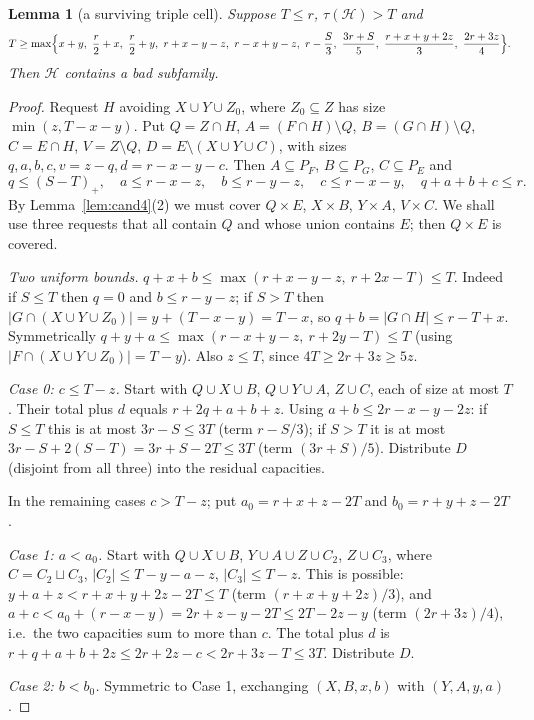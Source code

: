 \documentclass[11pt]{amsart}
\newtheorem{lemma}[theorem]{Lemma}
\theoremstyle{definition}
\theoremstyle{remark}
\newcommand{\cH}{\mathcal H}
\begin{document}
\begin{lemma}[a surviving triple cell]\label{lem:L31}
Suppose $T\le r$, $\tau(\cH)>T$ and
\[
T\ge\max\Bigl\{x+y,\ \frac r2+x,\ \frac r2+y,\ r+x-y-z,\ r-x+y-z,\ r-\frac S3,\ \frac{3r+S}{5},\ \frac{r+x+y+2z}{3},\ \frac{2r+3z}{4}\Bigr\}.
\]
Then $\cH$ contains a bad subfamily.
\end{lemma}
\begin{proof}
Request $H$ avoiding $X\cup Y\cup Z_0$, where $Z_0\subseteq Z$ has size $\min(z,T-x-y)$. Put $Q=Z\cap H$, $A=(F\cap H)\setminus Q$, $B=(G\cap H)\setminus Q$, $C=E\cap H$, $V=Z\setminus Q$, $D=E\setminus(X\cup Y\cup C)$, with sizes $q,a,b,c,v=z-q,d=r-x-y-c$. Then $A\subseteq P_F$, $B\subseteq P_G$, $C\subseteq P_E$ and
\[
q\le(S-T)_+,\quad a\le r-x-z,\quad b\le r-y-z,\quad c\le r-x-y,\quad q+a+b+c\le r .
\]
By Lemma~\ref{lem:cand4}(2) we must cover $Q\times E$, $X\times B$, $Y\times A$, $V\times C$. We shall use three requests that all contain $Q$ and whose union contains $E$; then $Q\times E$ is covered.

\emph{Two uniform bounds.} $q+x+b\le\max(r+x-y-z,\ r+2x-T)\le T$. Indeed if $S\le T$ then $q=0$ and $b\le r-y-z$; if $S>T$ then $|G\cap(X\cup Y\cup Z_0)|=y+(T-x-y)=T-x$, so $q+b=|G\cap H|\le r-T+x$. Symmetrically $q+y+a\le\max(r-x+y-z,\ r+2y-T)\le T$ (using $|F\cap(X\cup Y\cup Z_0)|=T-y$). Also $z\le T$, since $4T\ge2r+3z\ge5z$.

\emph{Case 0: $c\le T-z$.} Start with $Q\cup X\cup B$, $Q\cup Y\cup A$, $Z\cup C$, each of size at most $T$. Their total plus $d$ equals $r+2q+a+b+z$. Using $a+b\le 2r-x-y-2z$: if $S\le T$ this is at most $3r-S\le3T$ (term $r-S/3$); if $S>T$ it is at most $3r-S+2(S-T)=3r+S-2T\le3T$ (term $(3r+S)/5$). Distribute $D$ (disjoint from all three) into the residual capacities.

In the remaining cases $c>T-z$; put $a_0=r+x+z-2T$ and $b_0=r+y+z-2T$.

\emph{Case 1: $a<a_0$.} Start with $Q\cup X\cup B$, $Y\cup A\cup Z\cup C_2$, $Z\cup C_3$, where $C=C_2\sqcup C_3$, $|C_2|\le T-y-a-z$, $|C_3|\le T-z$. This is possible: $y+a+z< r+x+y+2z-2T\le T$ (term $(r+x+y+2z)/3$), and $a+c< a_0+(r-x-y)=2r+z-y-2T\le 2T-2z-y$ (term $(2r+3z)/4$), i.e.\ the two capacities sum to more than $c$. The total plus $d$ is $r+q+a+b+2z\le 2r+2z-c<2r+3z-T\le3T$. Distribute $D$.

\emph{Case 2: $b<b_0$.} Symmetric to Case 1, exchanging $(X,B,x,b)$ with $(Y,A,y,a)$.


\end{proof}
\end{document}
